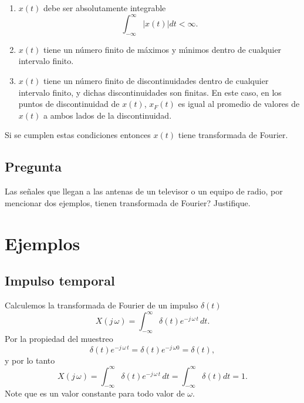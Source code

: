 \begin{enumerate}
        \item  $x\left( t\right) $ debe ser absolutamente integrable 
        \begin{equation}
                \int_{-\infty }^{\infty }\left| x\left( t\right) \right| dt<\infty .
        \end{equation}

        \item  $x\left( t\right) $ tiene un n\'{u}mero finito de m\'{a}ximos y m\'{\i}nimos dentro de 
        cualquier intervalo finito.

        \item  $x\left( t\right) $ tiene un n\'{u}mero finito de discontinuidades dentro de cualquier 
        intervalo finito, y dichas discontinuidades son finitas. En este caso, en los puntos de 
        discontinuidad de $x\left( t\right)$, $x_{F}\left( t\right)$ es 
        igual al promedio de valores de $x\left( t\right)$ a ambos lados de la discontinuidad.
\end{enumerate}
Si se cumplen estas condiciones entonces $x\left( t\right) $ tiene transformada de Fourier.

\subsection{Pregunta}

Las se\~{n}ales que llegan a las antenas de un televisor o un equipo de radio, por mencionar dos ejemplos, 
\textquestiondown tienen transformada de Fourier? Justifique.

\section{Ejemplos}



\subsection{Impulso temporal}

Calculemos la transformada de Fourier de un impulso $\delta \left( t\right) $
\begin{equation}
        X\left( j \, \omega \right) =  \int_{-\infty }^{\infty }\delta \left( t\right)e^{-j \, \omega \, t} \, dt.
\end{equation}
Por la propiedad del muestreo 
\begin{equation}
\delta \left( t\right) e^{-j \, \omega \, t}=
        \delta \left( t\right) e^{-j \, \omega0}=\delta \left( t\right) ,
\end{equation}
y por lo tanto 
\begin{equation}
X\left( j \, \omega \right) =
        \int_{-\infty }^{\infty }\delta \left( t\right)e^{-j \, \omega \, t} \, dt=
           \int_{-\infty }^{\infty }\delta \left( t\right) dt=1.
\end{equation}
Note que es un valor constante para todo valor de $\omega .$

